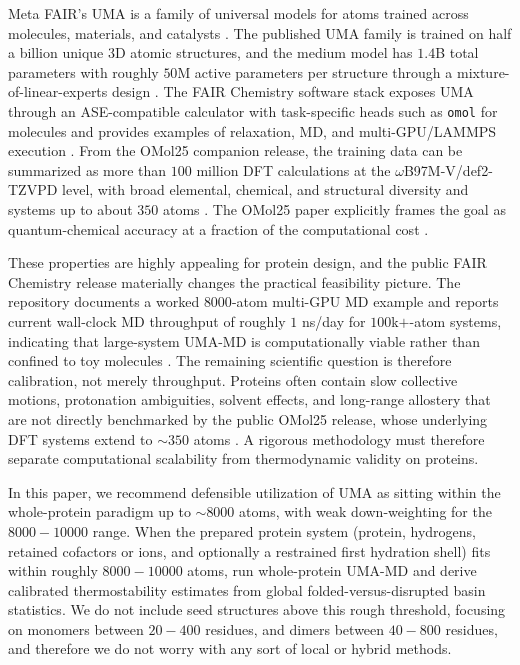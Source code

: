 \documentclass[11pt]{article}
\begin{document}
	Meta FAIR's UMA is a family of universal models for atoms trained across molecules, materials, and catalysts \citep{wood2025uma}. The published UMA family is trained on half a billion unique 3D atomic structures, and the medium model has $1.4$B total parameters with roughly $50$M active parameters per structure through a mixture-of-linear-experts design \citep{wood2025uma}. The FAIR Chemistry software stack exposes UMA through an ASE-compatible calculator with task-specific heads such as \texttt{omol} for molecules and provides examples of relaxation, MD, and multi-GPU/LAMMPS execution \citep{fairchem2025github}. From the OMol25 companion release, the training data can be summarized as more than $100$ million DFT calculations at the $\omega$B97M-V/def2-TZVPD level, with broad elemental, chemical, and structural diversity and systems up to about $350$ atoms \citep{levine2025omol25}. The OMol25 paper explicitly frames the goal as quantum-chemical accuracy at a fraction of the computational cost \citep{levine2025omol25}.
	
	These properties are highly appealing for protein design, and the public FAIR Chemistry release materially changes the practical feasibility picture. The repository documents a worked $8000$-atom multi-GPU MD example and reports current wall-clock MD throughput of roughly $1$ ns/day for $100$k$+$-atom systems, indicating that large-system UMA-MD is computationally viable rather than confined to toy molecules \citep{fairchem2025github}. The remaining scientific question is therefore calibration, not merely throughput. Proteins often contain slow collective motions, protonation ambiguities, solvent effects, and long-range allostery that are not directly benchmarked by the public OMol25 release, whose underlying DFT systems extend to $\sim 350$ atoms \citep{levine2025omol25}. A rigorous methodology must therefore separate computational scalability from thermodynamic validity on proteins.
	
	In this paper, we recommend defensible utilization of UMA as sitting within the whole-protein paradigm up to $\sim 8000$ atoms, with weak down-weighting for the $8000-10000$ range. When the prepared protein system (protein, hydrogens, retained cofactors or ions, and optionally a restrained first hydration shell) fits within roughly $8000-10000$ atoms, run whole-protein UMA-MD and derive calibrated thermostability estimates from global folded-versus-disrupted basin statistics. We do not include seed structures above this rough threshold, focusing on monomers between $20-400$ residues, and dimers between $40-800$ residues, and therefore we do not worry with any sort of local or hybrid methods. 
	
\end{document}
